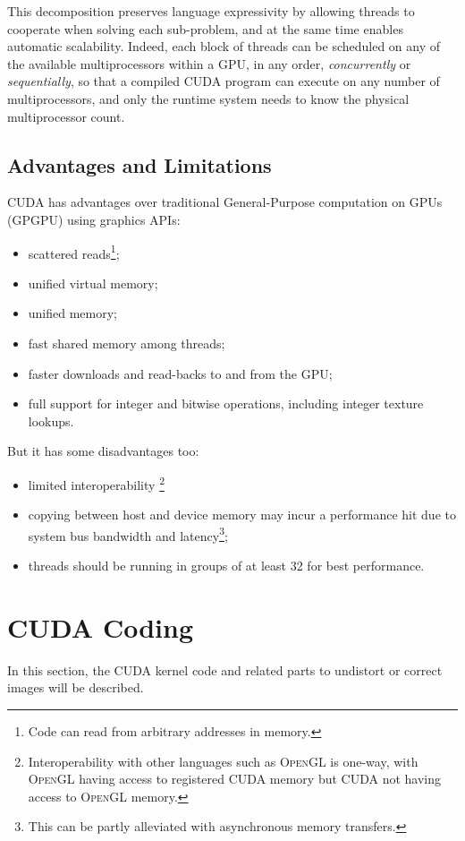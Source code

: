 \documentclass[12pt]{article}
\newcommand*{\Cuda}{\textsc{CUDA}}
\newcommand*{\OpenGL}{\textsc{OpenGL}}
\begin{document}
This decomposition preserves language expressivity by allowing threads to cooperate when solving each sub-problem, and at the same time enables automatic scalability. Indeed, each block of threads can be scheduled on any of the available multiprocessors within a GPU, in any order, \textit{concurrently} or \textit{sequentially}, so that a compiled \Cuda{} program can execute on any number of multiprocessors, and only the runtime system needs to know the physical multiprocessor count.
%
\subsection{Advantages and Limitations}
\Cuda{} has advantages over traditional General-Purpose computation on GPUs (GPGPU) using graphics APIs:
\begin{itemize}
	\setlength\itemsep{0em}
	\item scattered reads\footnote{ Code can read from arbitrary addresses in memory.};
	\item unified virtual memory;
	\item unified memory;
	\item fast shared memory among threads;
	\item faster downloads and read-backs to and from the GPU;
	\item full support for integer and bitwise operations, including integer texture lookups.
\end{itemize}
But it has some disadvantages too:
\begin{itemize}
	\setlength\itemsep{0em}
	\item limited interoperability \footnote{ Interoperability with other languages such as \OpenGL{} is one-way, with \OpenGL{} having access to registered \Cuda{} memory but \Cuda{} not having access to \OpenGL{} memory.}
	\item copying between host and device memory may incur a performance hit due to system bus bandwidth and latency\footnote{ This can be partly alleviated with asynchronous memory transfers.};
	\item threads should be running in groups of at least 32 for best performance.
\end{itemize}

\section{\Cuda{} Coding}

In this section, the \Cuda{} kernel code and related parts to undistort or correct images will be described.
\end{document}

